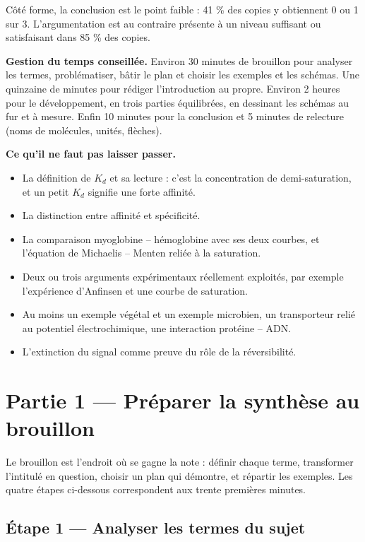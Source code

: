\documentclass[11pt,a4paper]{article}
\providecommand{\tightlist}{\setlength{\itemsep}{0pt}\setlength{\parskip}{0pt}}
\begin{document}
Côté forme, la conclusion est le point faible : 41 \% des copies y obtiennent 0 ou 1 sur 3. L'argumentation est au contraire présente à un niveau suffisant ou satisfaisant dans 85 \% des copies.

\textbf{Gestion du temps conseillée.} Environ 30 minutes de brouillon pour analyser les termes, problématiser, bâtir le plan et choisir les exemples et les schémas. Une quinzaine de minutes pour rédiger l'introduction au propre. Environ 2 heures pour le développement, en trois parties équilibrées, en dessinant les schémas au fur et à mesure. Enfin 10 minutes pour la conclusion et 5 minutes de relecture (noms de molécules, unités, flèches).

\textbf{Ce qu'il ne faut pas laisser passer.}

\begin{itemize}
\tightlist
\item
  La définition de \(K_d\) et sa lecture : c'est la concentration de demi-saturation, et un petit \(K_d\) signifie une forte affinité.
\item
  La distinction entre affinité et spécificité.
\item
  La comparaison myoglobine -- hémoglobine avec ses deux courbes, et l'équation de Michaelis -- Menten reliée à la saturation.
\item
  Deux ou trois arguments expérimentaux réellement exploités, par exemple l'expérience d'Anfinsen et une courbe de saturation.
\item
  Au moins un exemple végétal et un exemple microbien, un transporteur relié au potentiel électrochimique, une interaction protéine -- ADN.
\item
  L'extinction du signal comme preuve du rôle de la réversibilité.
\end{itemize}

\hypertarget{partie-1-pruxe9parer-la-synthuxe8se-au-brouillon}{%
\section{Partie 1 --- Préparer la synthèse au brouillon}\label{partie-1-pruxe9parer-la-synthuxe8se-au-brouillon}}

Le brouillon est l'endroit où se gagne la note : définir chaque terme, transformer l'intitulé en question, choisir un plan qui démontre, et répartir les exemples. Les quatre étapes ci-dessous correspondent aux trente premières minutes.

\hypertarget{uxe9tape-1-analyser-les-termes-du-sujet}{%
\subsection{Étape 1 --- Analyser les termes du sujet}\label{uxe9tape-1-analyser-les-termes-du-sujet}}
\end{document}
